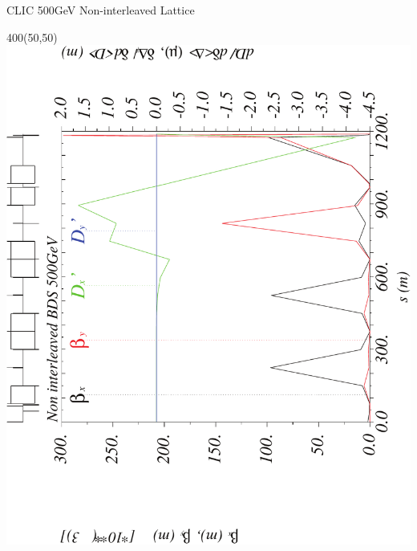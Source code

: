 \documentclass{beamer}
\begin{document}
\begin{frame}{CLIC 500GeV Non-interleaved Lattice}
  \setlength{\TPHorizModule}{1pt}
  \setlength{\TPVertModule}{1pt}
 \begin{textblock}{400}(50,50)
 \includegraphics[scale=0.4,angle=-90]{CLIC500noninter_ddx-crop.pdf}
 \end{textblock}
\end{frame}
\end{document}

